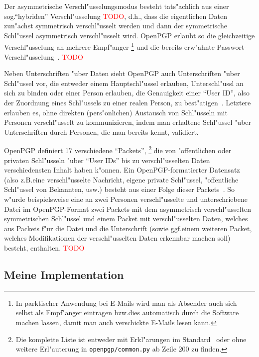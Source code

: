 \documentclass[12pt]{article}
\newcommand{\todo}[1]{\textcolor{red}{\mbox{TODO}}\marginpar{\textcolor{red}{#1}}}
\begin{document}
Der asymmetrische Verschl"usselungsmodus besteht tats"achlich aus einer sog.\@ "`hybriden"'
Verschl"usselung \todo{Bild?}, d.h.\@, dass die eigentlichen Daten zun"achst symmetrisch verschl"usselt werden
und dann der symmetrische Schl"ussel asymmetrisch verschl"usselt wird.
OpenPGP erlaubt so die gleichzeitige Verschl"usselung an mehrere Empf"anger%
\footnote{In parktischer Anwendung bei E-Mails wird man als Absender auch sich selbst
als Empf"anger eintragen bzw.\@ dies automatisch durch die Software machen lassen,
damit man auch verschickte E-Mails lesen kann.}
und die bereits erw"ahnte Passwort-Verschl"usselung~\cite{rfc4480}.
\todo{Spezifische Beispiele f"ur Alogrithmen?}

Neben Unterschriften "uber Daten sieht OpenPGP auch Unterschriften "uber Schl"ussel vor,
die entweder einem Hauptschl"ussel erlauben, Unterschl"ussl an sich zu binden oder
einer Person erlauben, die Genauigkeit einer "`User ID"', also der Zuordnung eines Schl"ussels
zu einer realen Person, zu best"atigen~\cite{rfc4480}.
Letztere erlauben es, ohne direkten (pers"onlichen) Austausch von Schl"usseln mit Personen
verschl"usselt zu kommunizieren, indem man erhaltene Schl"ussel "uber Unterschriften
durch Personen, die man bereits kennt, validiert.

OpenPGP definiert 17 verschiedene "`Packets"',%
\footnote{Die komplette Liste ist entweder mit Erkl"arungen im Standard~\cite{rfc4480}
oder ohne weitere Erl"auterung in \texttt{openpgp/common.py} ab Zeile 200 zu finden.}
die von "offentlichen oder privaten Schl"usseln "uber
"`User IDs"' bis zu verschl"usselten Daten verschiedensten Inhalt haben k"onnen.
Ein OpenPGP-formatierter Datensatz (also z.B.\@ eine verschl"usselte Nachricht, eigene private Schl"ussel,
"offentliche Schl"ussel von Bekannten, usw.\@) besteht aus einer Folge dieser Packets~\cite{rfc4480}.
So w"urde beispielsweise eine an zwei Personen verschl"usselte und unterschriebene Datei im OpenPGP-Format
zwei Packets mit dem asymmetrisch verschl"usselten symmetrischen Schl"ussel und einem Packet mit
verschl"usselten Daten, welches aus Packets f"ur die Datei und die Unterschrift
(sowie ggf.\@ einem weiteren Packet, welches Modifikationen der verschl"usselten Daten erkennbar machen soll)
besteht, enthalten. \todo{Bild?}

\subsection{Meine Implementation}
\end{document}
